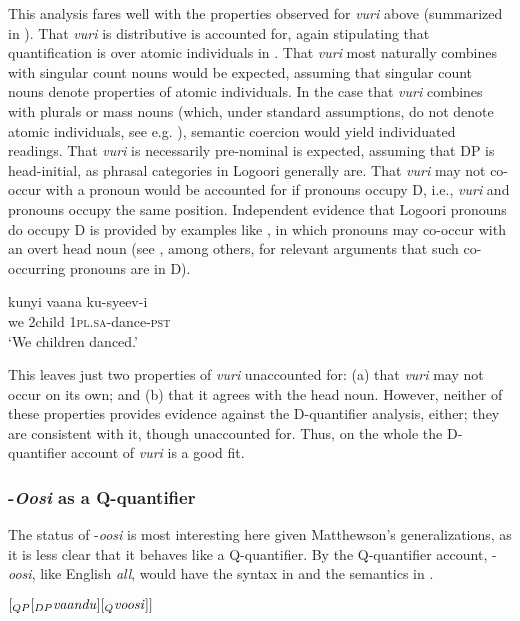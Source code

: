 \documentclass[output=paper]{langsci/langscibook}
\begin{document}
This analysis fares well with the properties observed for \textit{vuri} above (summarized in ). That \textit{vuri} is distributive is accounted for, again stipulating that quantification is over atomic individuals in . That \textit{vuri} most naturally combines with singular count nouns would be expected, assuming that singular count nouns denote properties of atomic individuals. In the case that \textit{vuri} combines with plurals or mass nouns (which, under standard assumptions, do not denote atomic individuals, see e.g. \citealt{Link1983}), semantic coercion would yield individuated readings. That \textit{vuri} is necessarily pre-nominal is expected, assuming that DP is head-initial, as phrasal categories in Logoori generally are. That \textit{vuri} may not co-occur with a pronoun would be accounted for if pronouns occupy D, i.e., \textit{vuri} and pronouns occupy the same position. Independent evidence that Logoori pronouns do occupy D is provided by examples like , in which pronouns may co-occur with an overt head noun (see \citealt{Postal1966}, among others, for relevant arguments that such co-occurring pronouns are in D).

\ea\label{ex:landman:20}
\gll kunyi  vaana    ku-syeev-i\\
     we  2child    1\textsc{pl}.\textsc{sa}-dance-\textsc{pst}  \\
\glt ‘We children danced.’
\z

  This leaves just two properties of \textit{vuri} unaccounted for: (a) that \textit{vuri} may not occur on its own; and (b) that it agrees with the head noun. However, neither of these properties provides evidence against the D-quantifier analysis, either; they are consistent with it, though unaccounted for. Thus, on the whole the D-quantifier account of \textit{vuri} is a good fit.

\subsubsection{-\textit{Oosi} as a Q-quantifier}

The status of -\textit{oosi} is most interesting here given Matthewson's generalizations, as it is less clear that it behaves like a Q-quantifier. By the Q-quantifier account, -\textit{oosi}, like English \textit{all}, would have the syntax in  and the semantics in .

\ea\label{ex:landman:21}
$[_{QP} [_{ DP} \text{\textit{vaandu}}] [_{Q} \text{\textit{voosi}}]]$
\z
\end{document}
